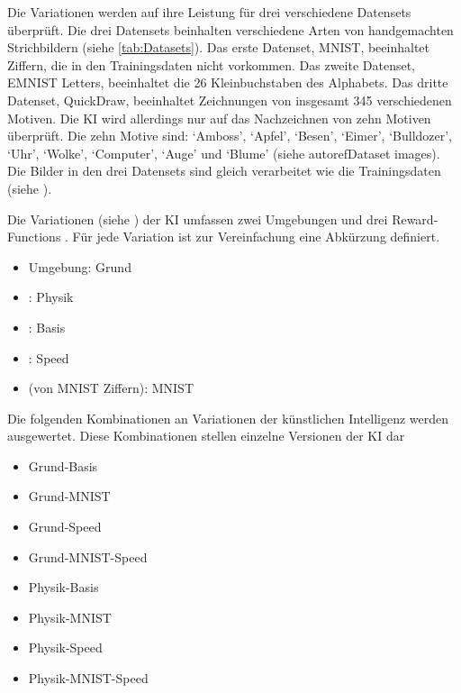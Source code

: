 Die Variationen werden auf ihre Leistung für drei verschiedene Datensets
überprüft. Die drei Datensets beinhalten verschiedene Arten von handgemachten
Strichbildern (siehe \autoref{tab:Datasets}). Das erste Datenset, MNIST,
beeinhaltet Ziffern, die in den Trainingsdaten nicht vorkommen. Das zweite
Datenset, EMNIST Letters, beeinhaltet die 26 Kleinbuchstaben des Alphabets. Das
dritte Datenset, QuickDraw, beeinhaltet Zeichnungen von insgesamt 345
verschiedenen Motiven. Die KI wird allerdings nur auf das Nachzeichnen von zehn
Motiven überprüft. Die zehn Motive sind: `Amboss', `Apfel', `Besen', `Eimer',
`Bulldozer', `Uhr', `Wolke', `Computer', `Auge' und `Blume' (siehe
autoref{Dataset images}). Die Bilder in den
drei Datensets sind gleich verarbeitet wie die Trainingsdaten (siehe
). 


Die Variationen (siehe ) der KI umfassen zwei Umgebungen und
drei Reward-Functions . Für jede Variation ist zur
Vereinfachung eine Abkürzung definiert.
\begin{itemize}
  \item {} Umgebung: Grund
  \item {}: Physik
  \item {}: Basis
  \item {}: Speed
  \item {} (von MNIST Ziffern): MNIST
\end{itemize}

Die folgenden Kombinationen an Variationen der künstlichen Intelligenz werden
ausgewertet. Diese Kombinationen stellen einzelne Versionen der KI dar
\begin{itemize}
  \item Grund-Basis
  \item Grund-MNIST
  \item Grund-Speed
  \item Grund-MNIST-Speed 
  \item Physik-Basis
  \item Physik-MNIST
  \item Physik-Speed
  \item Physik-MNIST-Speed
\end{itemize}

